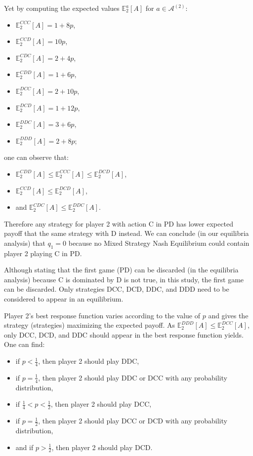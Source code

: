 \documentclass{article}
\newcommand{\E}{\mathbb E}
\begin{document}
Yet by computing the expected values $\E_2^a[A]$ for $a \in \mathcal A^{(2)}$:
\begin{itemize}
	\item $\E_2^{CCC}[A] = 1+8p$,
	\item $\E_2^{CCD}[A] = 10p$,
	\item $\E_2^{CDC}[A] = 2+4p$,
	\item $\E_2^{CDD}[A] = 1+6p$,
	\item $\E_2^{DCC}[A] = 2+10p$,
	\item $\E_2^{DCD}[A] = 1+12p$,
	\item $\E_2^{DDC}[A] = 3+6p$,
	\item $\E_2^{DDD}[A] = 2+8p$;
\end{itemize}
one can observe that:
\begin{itemize}
	\item $\E_2^{CDD}[A] \leq \E_2^{CCC}[A] \leq \E_2^{DCD}[A]$,
	\item $\E_2^{CCD}[A] \leq \E_2^{DCD}[A]$,
	\item and $\E_2^{CDC}[A] \leq \E_2^{DDC}[A]$.
\end{itemize}

Therefore any strategy for player 2 with action C in PD has lower expected payoff that the same strategy with
D instead. We can conclude (in our equilibria analysis) that $q_1 = 0$ because no Mixed Strategy Nash Equilibrium
could contain player 2 playing C in PD.

Although stating that the first game (PD) can be discarded (in the equilibria analysis) because C is dominated
by D is not true, in this study, the first game can be discarded. Only strategies DCC, DCD, DDC, and DDD need to be
considered to appear in an equilibrium.

Player 2's best response function varies according to the value of $p$ and gives the strategy (strategies) maximizing
the expected payoff. As $\E_2^{DDD}[A] \leq \E_2^{DCC}[A]$, only DCC, DCD, and DDC should appear in the best response
function yields. One can find:
\begin{itemize}
	\item if $p < \frac 14$, then player 2 should play DDC,
	\item if $p = \frac 14$, then player 2 should play DDC or DCC with any probability distribution,
	\item if $\frac 14 < p < \frac 12$, then player 2 should play DCC,
	\item if $p = \frac 12$, then player 2 should play DCC or DCD with any probability distribution,
	\item and if $p > \frac 12$, then player 2 should play DCD.
\end{itemize}
\end{document}
